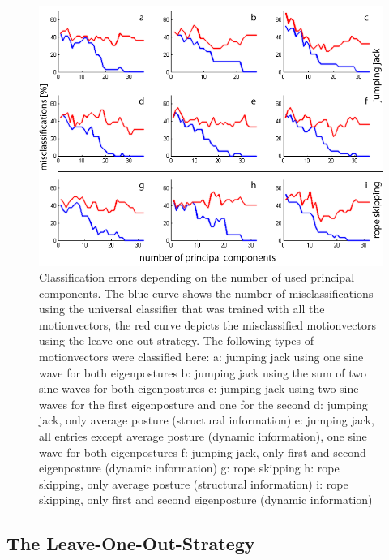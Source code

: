 \documentclass[a4paper]{article}
\begin{document}
\begin{figure}
		\centering
		\includegraphics[width=\textwidth]{klassifikation.png}
		\caption{Classification errors depending on the number of used principal components.
		The blue curve shows the number of misclassifications using the universal classifier that was trained with all the motionvectors, the red curve depicts the misclassified motionvectors using the leave-one-out-strategy.
		The following types of motionvectors were classified here:
		a: jumping jack using one sine wave for both eigenpostures
		b: jumping jack using the sum of two sine waves for both eigenpostures
		c: jumping jack using two sine waves for the first eigenposture and one for the second
		d: jumping jack, only average posture (structural information)
		e: jumping jack, all entries except average posture (dynamic information), one sine wave for both eigenpostures
		f: jumping jack, only first and second eigenposture (dynamic information)
		g: rope skipping
		h: rope skipping, only average posture (structural information)
		i: rope skipping, only first and second eigenposture (dynamic information)}
		\label{fig:classification}
\end{figure}

\subsection{The Leave-One-Out-Strategy}
\end{document}
